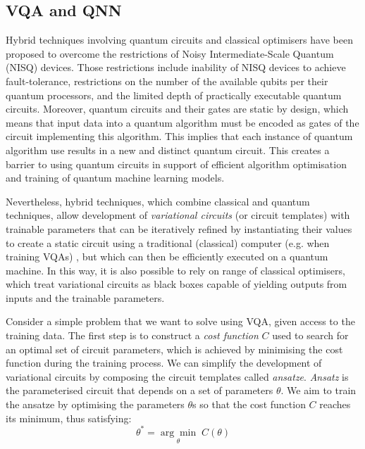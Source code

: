 \subsection{VQA and QNN}
\label{VQA}

Hybrid techniques involving quantum circuits and classical optimisers have been proposed to overcome the restrictions of Noisy Intermediate-Scale Quantum (NISQ) \cite{brooksQuantumSupremacyHunt2019} devices. 
Those restrictions include inability of NISQ devices to achieve fault-tolerance, restrictions on the number of the available qubits per their quantum processors, and the limited depth of practically executable quantum circuits. 
Moreover, quantum circuits and their gates are static by design, which means that input data into a quantum algorithm must be encoded as gates of the circuit implementing this algorithm. This implies that each instance of quantum algorithm use results in a new and distinct quantum circuit. This creates a barrier to using quantum circuits in support of efficient algorithm optimisation and training of quantum machine learning models.

Nevertheless, hybrid techniques, which combine classical and quantum techniques, allow development of \emph{variational circuits} (or circuit templates) with trainable parameters that can be iteratively refined by instantiating their values to create a static circuit using a traditional (classical) computer (e.g. when training VQAs) \cite{cerezo2021variational}, but which can then be efficiently executed on a quantum machine.
In this way, it is also possible to rely on range of classical optimisers, which treat variational circuits as black boxes capable of yielding outputs from inputs and the trainable parameters.

Consider a simple problem that we want to solve using VQA, given access to the training data.
The first step is to construct a \textit{cost function} $C$ used to search for an optimal set of circuit parameters, which is achieved by minimising the cost function during the training process.
We can simplify the development of variational circuits by composing the circuit templates called \textit{ansatze}. 
\textit{Ansatz} is the parameterised circuit that depends on a set of parameters $\theta$. We aim to train the ansatze by optimising the parameters $\theta$s so that the cost function $C$ reaches its minimum, thus satisfying:
\begin{equation}
    \theta^* = \underset{\theta}{\arg \min} \;C(\theta)
    \label{optimize theta with ansatz}
\end{equation}

